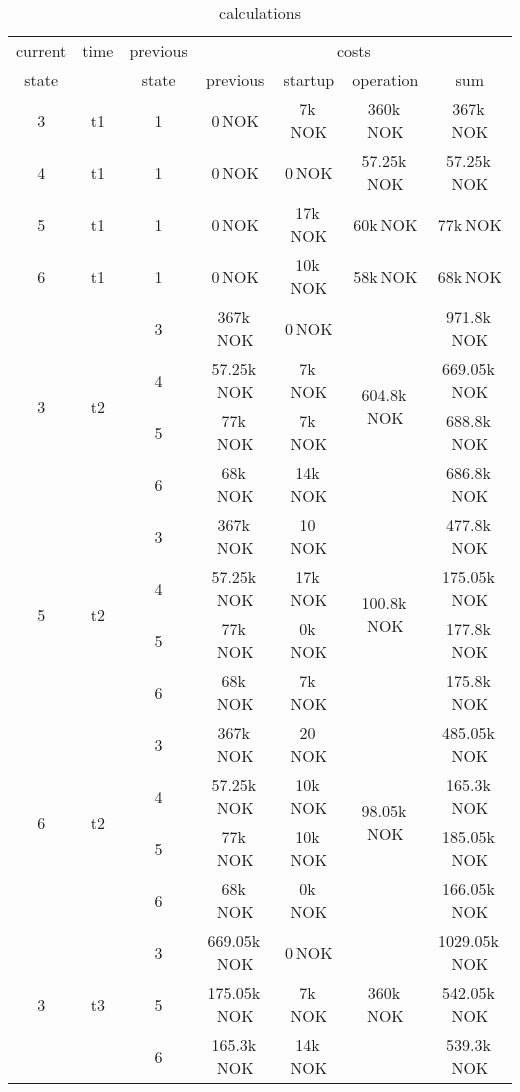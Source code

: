 \documentclass{article}
\begin{document}
	\begin{table}[hbt!]
\begin{center}
\begin{tabular}[h]{|c|c|c||c|c|c||c|}
\hline
current & time & previous   & \multicolumn{4}{|c|}{costs}\\
\cline{4-7}
state  		&      	&  state    &   previous    	&    startup   		& operation 		&  sum \\
\hline
\hline
 3			&	t1	&	1		&		0\,NOK		&	7k\,NOK			&	360k\,NOK		& 367k\,NOK\\
\hline
 4			&	t1	&	1		&		0\,NOK		&	0\,NOK			&	57.25k\,NOK		& 57.25k\,NOK\\
\hline
 5			&	t1	&	1		&		0\,NOK		&	17k\,NOK		&	60k\,NOK		& 77k\,NOK\\
\hline
 6			&	t1	&	1		&		0\,NOK		&	10k\,NOK		&	58k\,NOK		& 68k\,NOK\\
\hline
\hline
\multirow{4}{*}{3} & \multirow{4}{*}{t2} 
	&	3		&		367k\,NOK	&	0\,NOK			&	\multirow{4}{*}{604.8k\,NOK}		&	971.8k\,NOK\\
&	&	4		&		57.25k\,NOK	&	7k\,NOK			&										&	669.05k\,NOK\\
&	&	5		&		77k\,NOK	&	7k\,NOK			&										&	688.8k\,NOK\\
&	&	6		&		68k\,NOK	&	14k\,NOK		&										&	686.8k\,NOK\\
\hline
\multirow{4}{*}{5} & \multirow{4}{*}{t2}	
	&	3		&		367k\,NOK	&	10\,NOK			&	\multirow{4}{*}{100.8k\,NOK}		&	477.8k\,NOK\\
&	&	4		&		57.25k\,NOK	&	17k\,NOK		&										&	175.05k\,NOK\\
&	&	5		&		77k\,NOK	&	0k\,NOK			&										&	177.8k\,NOK\\
&	&	6		&		68k\,NOK	&	7k\,NOK			&										&	175.8k\,NOK\\
\hline
\multirow{4}{*}{6} & \multirow{4}{*}{t2}	
	&	3		&		367k\,NOK	&	20\,NOK			&	\multirow{4}{*}{98.05k\,NOK}		&	485.05k\,NOK\\
&	&	4		&		57.25k\,NOK	&	10k\,NOK		&										&	165.3k\,NOK\\
&	&	5		&		77k\,NOK	&	10k\,NOK		&										&	185.05k\,NOK\\
&	&	6		&		68k\,NOK	&	0k\,NOK			&										&	166.05k\,NOK\\
\hline
\hline
\multirow{4}{*}{3} & \multirow{4}{*}{t3}	
	&	3		&		669.05k\,NOK	&	0\,NOK			&	\multirow{4}{*}{360k\,NOK}			&	1029.05k\,NOK\\
&	&	5		&		175.05k\,NOK	&	7k\,NOK			&										&	542.05k\,NOK\\
&	&	6		&		165.3k\,NOK		&	14k\,NOK		&										&	539.3k\,NOK\\
\hline


\end{tabular}
\caption{calculations}\label{tab:calc}
\end{center}
\end{table}
\end{document}
